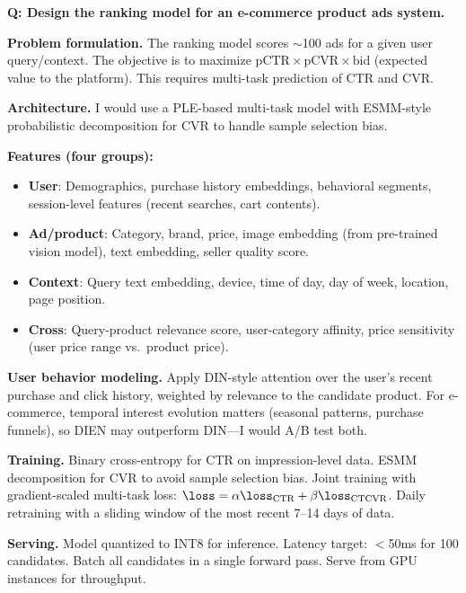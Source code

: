 \begin{interviewq}
\textbf{Q: Design the ranking model for an e-commerce product ads system.}

 \quad {} \quad \badgefreq{\freqhigh}

\stronganswer

\textbf{Problem formulation.} The ranking model scores $\sim$100 ads for a given user query/context. The objective is to maximize $\text{pCTR} \times \text{pCVR} \times \text{bid}$ (expected value to the platform). This requires multi-task prediction of CTR and CVR.

\textbf{Architecture.} I would use a PLE-based multi-task model with ESMM-style probabilistic decomposition for CVR to handle sample selection bias.

\textbf{Features (four groups):}
\begin{itemize}
    \item \textbf{User}: Demographics, purchase history embeddings, behavioral segments, session-level features (recent searches, cart contents).
    \item \textbf{Ad/product}: Category, brand, price, image embedding (from pre-trained vision model), text embedding, seller quality score.
    \item \textbf{Context}: Query text embedding, device, time of day, day of week, location, page position.
    \item \textbf{Cross}: Query-product relevance score, user-category affinity, price sensitivity (user price range vs.\ product price).
\end{itemize}

\textbf{User behavior modeling.} Apply DIN-style attention over the user's recent purchase and click history, weighted by relevance to the candidate product. For e-commerce, temporal interest evolution matters (seasonal patterns, purchase funnels), so DIEN may outperform DIN---I would A/B test both.

\textbf{Training.} Binary cross-entropy for CTR on impression-level data. ESMM decomposition for CVR to avoid sample selection bias. Joint training with gradient-scaled multi-task loss: $\loss = \alpha \loss_{\text{CTR}} + \beta \loss_{\text{CTCVR}}$. Daily retraining with a sliding window of the most recent 7--14 days of data.

\textbf{Serving.} Model quantized to INT8 for inference. Latency target: $<$50ms for 100 candidates. Batch all candidates in a single forward pass. Serve from GPU instances for throughput.


\end{interviewq}
